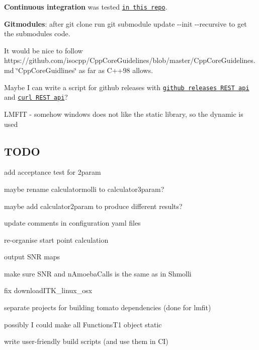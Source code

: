 \begin{DoxyItemize}
\item {\bfseries Continuous integration} was tested \href{https://github.com/MRKonrad/ContinousIntegrationPlayground}{\tt in this repo}.
\item {\bfseries Gitmodules}\-: after {\ttfamily git clone} run {\ttfamily git submodule update -\/-\/init -\/-\/recursive} to get the submodules code.
\item It would be nice to follow https\-://github.com/isocpp/\-Cpp\-Core\-Guidelines/blob/master/\-Cpp\-Core\-Guidelines.\-md \char`\"{}\-Cpp\-Core\-Guidlines\char`\"{} as far as C++98 allows.
\item Maybe I can write a script for github releases with \href{https://developer.github.com/v3/repos/releases/#create-a-release}{\tt github releases R\-E\-S\-T api} and \href{http://www.codingpedia.org/ama/how-to-test-a-rest-api-from-command-line-with-curl/#12_HEAD_requests}{\tt curl R\-E\-S\-T api}?
\item L\-M\-F\-I\-T -\/ somehow windows does not like the static library, so the dynamic is used
\end{DoxyItemize}

\subsection*{T\-O\-D\-O}


\begin{DoxyItemize}
\item add acceptance test for 2param
\item maybe rename calculatormolli to calculator3param?
\item maybe add calculator2param to produce different results?
\item update comments in configuration yaml files
\item re-\/organise start point calculation
\item output S\-N\-R maps
\item make sure S\-N\-R and n\-Amoeba\-Calls is the same as in Shmolli
\item fix download\-I\-T\-K\-\_\-linux\-\_\-osx
\item separate projects for building tomato dependencies (done for lmfit)
\item possibly I could make all Functions\-T1 object static
\item write user-\/friendly build scripts (and use them in C\-I) 
\end{DoxyItemize}